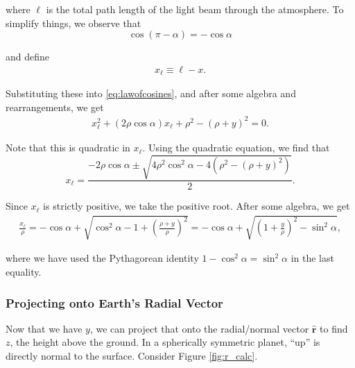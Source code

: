 \documentclass[10pt]{article}
\begin{document}
where $\ell$ is the total path length of the light beam through the atmosphere. To simplify things, we observe that
$$
\cos(\pi - \alpha) = -\cos \alpha
$$

and define
\begin{align} \label{eq:xl-def}
x_{\ell} \equiv \ell - x.
\end{align}

Substituting these into \eqref{eq:lawofcosines}, and after some algebra and rearrangements, we get
\begin{align}
x_{\ell}^2 + (2\rho \cos \alpha) x_{\ell} + \rho^2 - (\rho+y)^2 = 0.
\end{align}

Note that this is quadratic in $x_{\ell}$. Using the quadratic equation, we find that
$$
x_{\ell} = \frac{-2\rho\cos\alpha \pm \sqrt{4\rho^2 \cos^2 \alpha - 4(\rho^2 - (\rho+y)^2)}}{2}.
$$

Since $x_{\ell}$ is strictly positive, we take the positive root. After some algebra, we get
\begin{align}\label{eq:xltoy}
\frac{x_{\ell}}{\rho} = -\cos \alpha + \sqrt{\cos^2\alpha - 1 + \left(\frac{\rho+y}{\rho}\right)^2} = -\cos \alpha + \sqrt{\left(1 + \frac{y}{\rho}\right)^2 - \sin^2 \alpha},
\end{align}

where we have used the Pythagorean identity $1-\cos^2 \alpha = \sin^2 \alpha$ in the last equality.

\subsubsection{Projecting onto Earth's Radial Vector}
\label{subsubsec:radial_vec}
Now that we have $y$, we can project that onto the radial/normal vector $\mathbf{\hat{r}}$ to find $z$, the height above the ground. In a spherically symmetric planet, "`up"' is directly normal to the surface. Consider Figure \ref{fig:r_calc}.
\end{document}

